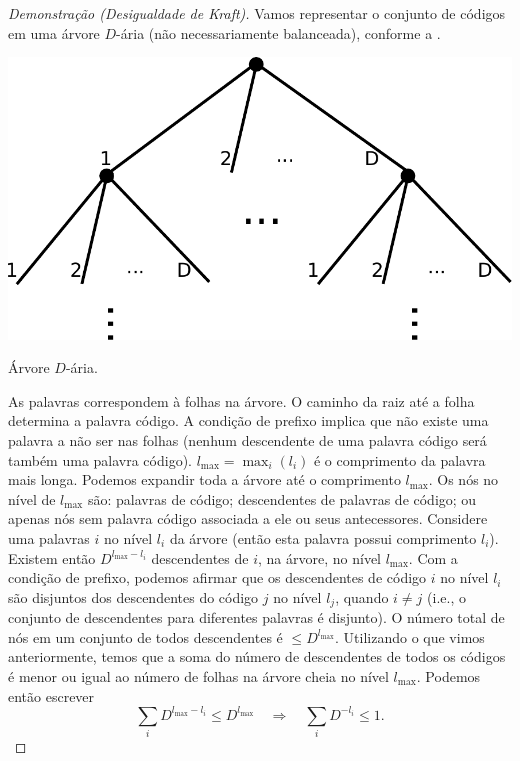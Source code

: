 \begin{proof}[Demonstração (Desigualdade de Kraft)]
Vamos representar o conjunto de códigos em uma árvore $D$-ária (não necessariamente balanceada),
conforme a .

\begin{marginfigure}
\includegraphics[width=\textwidth]{figures/Dtree.pdf}
\caption{Árvore $D$-ária.}\label{fig:Dtree}
\end{marginfigure}

As palavras correspondem à folhas na árvore. O caminho da raiz até a folha determina a palavra código.
A condição de prefixo implica que não existe uma palavra a não ser nas folhas
(nenhum descendente de uma palavra código será também uma palavra código).
$l_{\text{max}} = \max_i (l_i)$ é o comprimento da palavra mais longa.
Podemos expandir toda a árvore até o comprimento $l_{\text{max}}$.
Os nós no nível de $l_{\text{max}}$ são: palavras de código; descendentes de palavras de código; ou
apenas nós sem palavra código associada a ele ou seus antecessores.
Considere uma palavras $i$ no nível $l_i$ da árvore (então esta palavra possui comprimento $l_i$).
Existem então $D^{l_{\text{max}} - l_i}$ descendentes de $i$, na árvore, no nível $l_{\text{max}}$.
Com a condição de prefixo, podemos afirmar que os descendentes de código $i$ no nível $l_i$ são
disjuntos dos descendentes do código $j$ no nível $l_j$, quando $i \neq j$ (i.e., o conjunto de
descendentes para diferentes palavras é disjunto).
O número total de nós em um conjunto de todos descendentes é $\leq D^{l_{\text{max}}}$.
Utilizando o que vimos anteriormente, temos que a soma do número de descendentes de todos os códigos é menor ou
igual ao número de folhas na árvore cheia no nível $l_{\text{max}}$. Podemos então escrever
\begin{equation}
\sum_i D^{l_{\text{max}} - l_i} \leq D^{l_{\text{max}}} \quad \Rightarrow \quad \sum_i D^{-l_i} \leq 1 .
\end{equation}


\end{proof}
